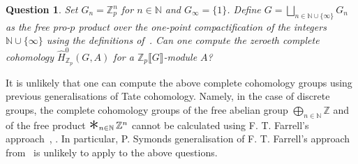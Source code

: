 \documentclass[12pt,a4paper]{article}
\numberwithin{equation}{section}
\newtheorem{ques}[thm]{Question}
\theoremstyle{nonumberplain}
\newcommand{\bigast}{\mathop{\scalebox{2}{\raisebox{-0.1ex}{$\ast$}}}}%
\begin{document}
\begin{ques}
Set $G_n = \mathbb{Z}_p^n$ for $n \in \mathbb{N}$ and $G_{\infty} = \lbrace 1 \rbrace$. Define $G = \bigsqcup_{n \in \mathbb{N} \cup \lbrace \infty \rbrace} G_n$ as the free pro-$p$ product over the one-point compactification of the integers $\mathbb{N} \cup \lbrace \infty \rbrace$ using the definitions of~\cite[p.~137--140]{rib17}. Can one compute the zeroeth complete cohomology $\widehat{H}_{\mathbb{Z}_p}^0(G, A)$ for a $\mathbb{Z}_p\llbracket G \rrbracket$-module $A$?
\end{ques}

It is unlikely that one can compute the above complete cohomology groups using previous generalisations of Tate cohomology. Namely, in the case of discrete groups, the complete cohomology groups of the free abelian group $\bigoplus_{n \in \mathbb{N}} \mathbb{Z}$ and of the free product $\bigast_{n \in \mathbb{N}} \mathbb{Z}^n$ cannot be calculated using F.\! T.\! Farrell's approach~\cite[Example~5.3]{cor97}, \cite[p.~119--120]{dem05}. In particular, P.\! Symonds generalisation of F.\! T.\! Farrell's approach from~\cite[p.~34]{sym07} is unlikely to apply to the above questions. \\
\end{document}
